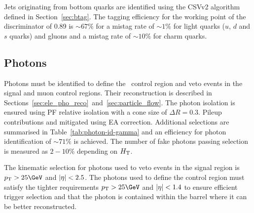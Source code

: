 Jets originating from bottom quarks are identified using the CSVv2 algorithm defined in Section~\ref{sec:btag}. 
The tagging efficiency for the working point of the discriminator of 0.89 is $\sim 67\%$ for a mistag rate
of $\sim 1\%$ for light quarks ($u$, $d$ and $s$ quarks) and gluons and a mistag rate of $\sim 10\%$ for
charm quarks.

\subsection{Photons}

Photons must be identified to define the \gj~control region and veto events in the signal and
muon control regions. Their reconstruction is described in Sections~\ref{sec:ele_pho_reco}~and~\ref{sec:particle_flow}. The photon isolation is 
ensured using PF relative isolation with a cone size of $\Delta R = 0.3$. Pileup contributions 
and mitigated using EA correction. Additional selections are summarised 
in Table~\ref{tab:photon-id-gamma} and an efficiency for photon identification of $\sim71\%$
is achieved. The number of fake photons passing selection is measured as $2-10\%$ depending on $\mbox{$H_\text{T}$}$.

The kinematic selection for photons used to veto events in the signal region is $\pt > 25\GeV$
and $|\eta| < 2.5$. The photons used to define the control region must satisfy the tighter 
requirements $\pt > 25\GeV$ and $|\eta| < 1.4$ to ensure efficient trigger selection and
that the photon is contained within the barrel where it can be better reconstructed.

